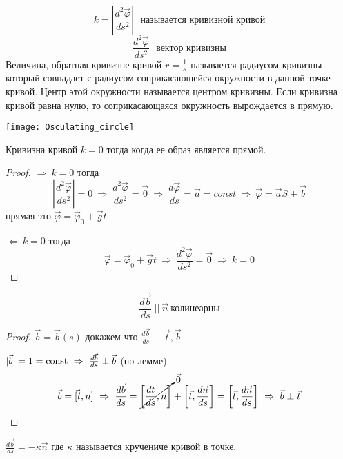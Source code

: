 \begin{define}
  $$
  k =
  \left|
    \frac{d^2 \vec \varphi}{d s^2}
  \right| ~~~
  \text{называется кривизной кривой}
  $$
  $$
    \frac{d^2 \vec \varphi}{d s^2} ~~~ \text{вектор кривизны}
  $$
  Величина, обратная кривизне кривой $r = \frac{1}{\kappa}$ называется радиусом
  кривизны который совпадает с радиусом соприкасающейся окружности в данной
  точке кривой. Центр этой окружности называется центром кривизны. Если кривизна
  кривой равна нулю, то соприкасающаяся окружность вырождается в прямую.

  \texttt{[image: Osculating\_circle]}
\end{define}

\begin{theorem}
  Кривизна кривой $k = 0$ тогда когда ее образ является прямой.
\end{theorem}

\begin{proof}
  $\Rightarrow ~ k = 0$ тогда
  $$
  \left| \frac{d^2 \vec \varphi}{ds^2} \right| = 0 ~ \Rightarrow ~
  \frac{d^2 \vec \varphi}{ds^2} = \vec 0 ~ \Rightarrow ~
  \frac{d\vec \varphi}{d s} = \vec a = const ~ \Rightarrow ~
  \vec \varphi = \vec a S + \vec b
  $$
  прямая это $\vec \varphi = \vec \varphi_0 + \vec g t$

  $\Leftarrow ~ k = 0$ тогда
  $$
  \vec \varphi = \vec \varphi_0 + \vec g t ~ \Rightarrow ~
  \frac{d^2 \vec \varphi}{ds^2} = \vec 0 ~ \Rightarrow ~ k = 0
  $$
\end{proof}

\begin{block}[Лемма]
  $$
  \frac{d\vec b}{ds} ~ || ~ \vec n ~ \text{колинеарны}
  $$
\end{block}

\begin{proof}
  $\vec b = \vec b(s)$ докажем что $\frac{d \vec b}{ds} \perp \vec t, \vec b$

  $|\vec b| = 1 = \mathrm{const} ~ \Rightarrow ~ \frac{d\vec b}{ds} \perp \vec b$
  (по лемме)
  $$
  \vec b = [\vec \vec t, \vec n] ~ \Rightarrow ~ \frac{d\vec b}{ds} =
  \cancelto{\vec 0}{\left[\frac{dt}{ds}, \vec n\right]} +
  \left[\vec t, \frac{d\vec n}{ds}\right] =
  \left[\vec t, \frac{d\vec n}{ds}\right] ~ \Rightarrow ~ \vec b \perp \vec t
  $$
\end{proof}

\begin{define}
  $\frac{d\vec b}{ds} = -\kappa \vec n$ где $\kappa$ называется кручениче кривой
  в точке.
\end{define}


